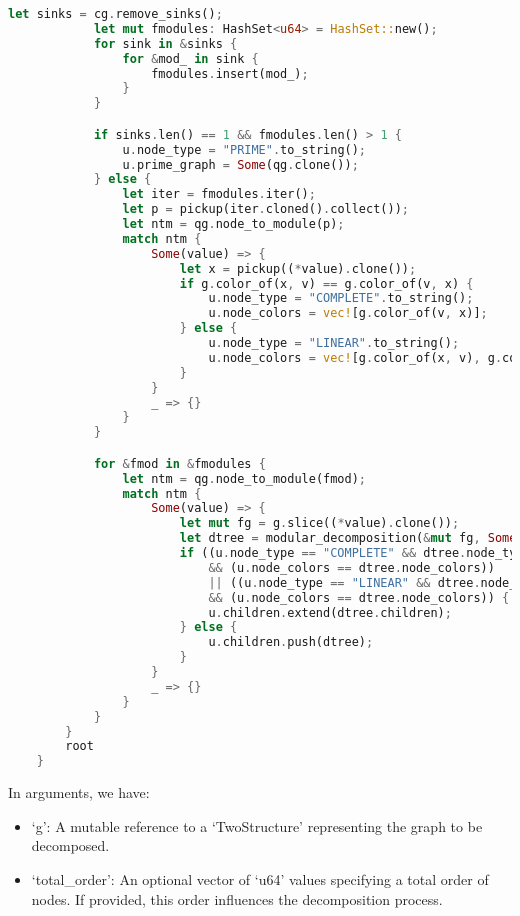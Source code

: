 \begin{lstlisting}[language=Rust, style=rust, caption={Defining the modular decomposition with Rust}, label={lst:rust-define-modular-decomposition}, firstnumber=1]
            let sinks = cg.remove_sinks();
            let mut fmodules: HashSet<u64> = HashSet::new();
            for sink in &sinks {
                for &mod_ in sink {
                    fmodules.insert(mod_);
                }
            }

            if sinks.len() == 1 && fmodules.len() > 1 {
                u.node_type = "PRIME".to_string();
                u.prime_graph = Some(qg.clone());
            } else {
                let iter = fmodules.iter();
                let p = pickup(iter.cloned().collect());
                let ntm = qg.node_to_module(p);
                match ntm {
                    Some(value) => {
                        let x = pickup((*value).clone());
                        if g.color_of(x, v) == g.color_of(v, x) {
                            u.node_type = "COMPLETE".to_string();
                            u.node_colors = vec![g.color_of(v, x)];
                        } else {
                            u.node_type = "LINEAR".to_string();
                            u.node_colors = vec![g.color_of(x, v), g.color_of(v, x)];
                        }
                    }
                    _ => {}
                }
            }

            for &fmod in &fmodules {
                let ntm = qg.node_to_module(fmod);
                match ntm {
                    Some(value) => {
                        let mut fg = g.slice((*value).clone());
                        let dtree = modular_decomposition(&mut fg, Some(total_order.clone()));
                        if ((u.node_type == "COMPLETE" && dtree.node_type == "COMPLETE")
                            && (u.node_colors == dtree.node_colors))
                            || ((u.node_type == "LINEAR" && dtree.node_type == "LINEAR")
                            && (u.node_colors == dtree.node_colors)) {
                            u.children.extend(dtree.children);
                        } else {
                            u.children.push(dtree);
                        }
                    }
                    _ => {}
                }
            }
        }
        root
    }
\end{lstlisting}

In arguments, we have:
\begin{itemize}
    \item `g': A mutable reference to a `TwoStructure' representing the graph to be decomposed.
    \item `total\_order': An optional vector of `u64' values specifying a total order of nodes.
    If provided, this order influences the decomposition process.
\end{itemize}

